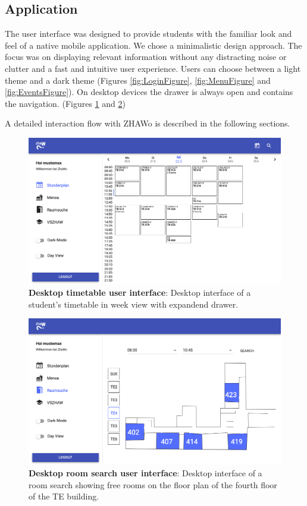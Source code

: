 \begin{markdown}
\section{Application} \label{results}

The user interface was designed to provide students with the familiar look and feel of a native mobile application. We chose a minimalistic design approach. The focus was on displaying relevant information without any distracting noise or clutter and a fast and intuitive user experience. Users can choose between a light theme and a dark theme (Figures \ref{fig:LoginFigure}, \ref{fig:MenuFigure} and \ref{fig:EventsFigure}).
On desktop devices the drawer is always open and contains the navigation. (Figures \ref{fig:DesktopSchedule} and \ref{fig:DesktopRoomsearch})

A detailed interaction flow with ZHAWo is described in the following sections.
\begin{figure}[H]
  \includegraphics[width=12cm, center]{./figures/desktop_schedule.png}
  \captionsetup{width=11.5cm}
  \caption[Desktop timetable user interface]{\textbf{Desktop timetable user interface}: Desktop interface of a student's timetable in week view with expandend drawer.}
  \label{fig:DesktopSchedule}
\end{figure}

\begin{figure}[H]
  \includegraphics[width=12cm, center]{./figures/desktop_roomsearch.png}
  \captionsetup{width=11.5cm}
  \caption[Desktop room search user interface]{\textbf{Desktop room search user interface}: Desktop interface of a room search showing free rooms on the floor plan of the fourth floor of the TE building.}
  \label{fig:DesktopRoomsearch}
\end{figure}


\end{markdown}

